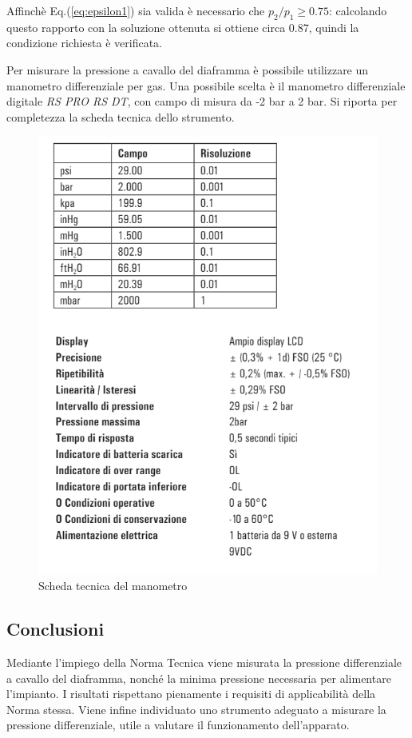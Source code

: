 Affinchè Eq.(\ref{eq:epsilon1}) sia valida è necessario che $p_2/p_1 \geqslant 0.75 $: calcolando questo rapporto con la soluzione ottenuta si ottiene circa 0.87, quindi la condizione richiesta è verificata.

Per misurare la pressione a cavallo del diaframma è possibile utilizzare un manometro differenziale per gas. Una possibile scelta è il manometro differenziale digitale \textit{RS PRO RS DT}, con campo di misura da -2 bar a 2 bar. Si riporta per completezza la scheda tecnica dello strumento.
\begin{figure} [H]
	\centering
	\includegraphics[width=0.5\linewidth]{chapters/3-misuradiaframma/scheda}
	\caption{Scheda tecnica del manometro}
	\label{fig:scheda}
\end{figure}

\subsection{Conclusioni}
Mediante l'impiego della Norma Tecnica viene misurata la pressione differenziale a cavallo del diaframma, nonché la minima pressione necessaria per alimentare l'impianto. I risultati rispettano pienamente i requisiti di applicabilità della Norma stessa. Viene infine individuato uno strumento adeguato a misurare la pressione differenziale, utile a valutare il funzionamento dell'apparato.